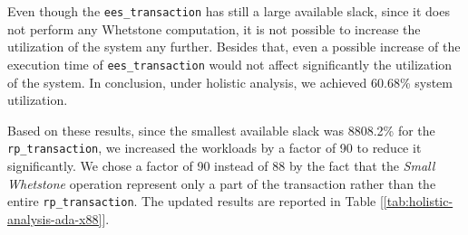 Even though the \texttt{ees\_transaction} has still a large available slack,
since it does not perform any Whetstone computation, it is not possible to 
increase the utilization of the system any further. Besides that, even a
possible increase of the execution time of \texttt{ees\_transaction} would 
not affect significantly the utilization of the system. In conclusion, under
holistic analysis, we achieved 60.68\% system utilization.

\begin{table}[H]
  \caption{Holistic Analysis Results Ada}
  \label{tab:holistic-analysis-ada}
\end{table}

Based on these results, since the smallest available slack was 8808.2\% for the 
\texttt{rp\_transaction}, we increased the workloads by a factor of 90 to
reduce it significantly. We chose a factor of 90 instead of 88 by the fact that
the \textit{Small Whetstone} operation represent only a part of the transaction
rather than the entire \texttt{rp\_transaction}.
\label{lab:90-increase-factor}
The updated results are reported in Table [\ref{tab:holistic-analysis-ada-x88}].  

